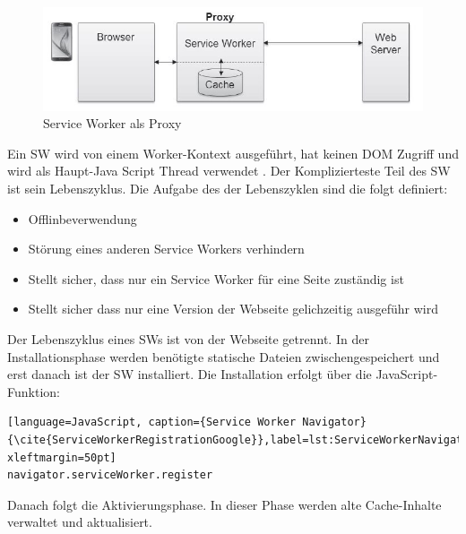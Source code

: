 \begin{figure}[h]
	\centering
	\includegraphics[width=14cm]{BilderAllgemein/SWProxy}\medskip
	\caption{Service Worker als Proxy \cite{SWProxy}}
	\label{fig:SWProxy}
\end{figure}

Ein \acs{SW} wird von einem Worker-Kontext  ausgeführt, hat keinen DOM Zugriff und wird als Haupt-Java Script Thread verwendet \cite{Worker} \cite{ServiceWorker}.
Der Komplizierteste Teil des \acs{SW} ist sein Lebenszyklus. 
Die Aufgabe des der Lebenszyklen sind die folgt definiert:

\begin{itemize}
    \item  Offlinbeverwendung
	\item  Störung eines anderen Service Workers verhindern
	\item  Stellt sicher, dass nur ein Service Worker für eine Seite zuständig ist
	\item  Stellt sicher dass nur eine Version der Webseite gelichzeitig ausgeführ wird
\end{itemize}


Der Lebenszyklus eines \acs{SW}s ist von der Webseite getrennt.
In der Installationsphase werden benötigte statische Dateien zwischengespeichert und erst danach ist der \acs{SW} installiert. Die Installation erfolgt über die JavaScript-Funktion:

\begin{lstlisting}[language=JavaScript, caption={Service Worker Navigator} {\cite{ServiceWorkerRegistrationGoogle}},label=lst:ServiceWorkerNavigator, xleftmargin=50pt]
navigator.serviceWorker.register
\end{lstlisting}

Danach folgt die Aktivierungsphase. In dieser Phase werden alte Cache-Inhalte verwaltet und aktualisiert.




